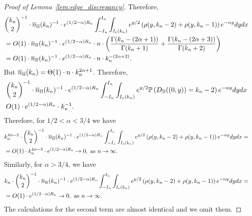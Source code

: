 \begin{proof}[Proof of Lemma~\ref{lem:edge_discrepancy}]
Therefore, 
\begin{equation*} 
\begin{split}
&{k_n \choose 2}^{-1} \cdot \overline{n}_{\mathbb{H}}(k_n)^{-1} \cdot 
e^{(1/2 - \alpha)R_n}
\int_{-I_n}^{I_n} \int_{I_\varepsilon (k_n)} e^{y/2}
\left( \rho(y,k_n-2) + \rho(y,k_n-1) \right) e^{-\alpha y} dy dx \\ 
&=O(1) \cdot \overline{n}_{\mathbb{H}}(k_n)^{-1} \cdot 
e^{(1/2 - \alpha)R_n} \cdot n \cdot \left( 
 \frac{ \Gamma (k_n-(2\alpha+1))}{\Gamma (k_n+1)} + \frac{\Gamma (k_n-(2\alpha+3))}{\Gamma (k_n+2)}\right) \\
& =O(1) \cdot \overline{n}_{\mathbb{H}}(k_n)^{-1} \cdot 
e^{(1/2 - \alpha)R_n} \cdot n \cdot k_n^{-(2\alpha +2)}.
\end{split}
\end{equation*}
But $\overline{n}_{\mathbb{H}}(k_n) = \Theta (1) \cdot n \cdot k_n^{2\alpha +1}$. 
Therefore, 
\begin{equation*} 
\begin{split}
&{k_n \choose 2}^{-1} \cdot \overline{n}_{\mathbb{H}}(k_n)^{-1} \cdot 
e^{(1/2 - \alpha)R_n}
\int_{-I_n}^{I_n} \int_{I_\varepsilon (k_n)} e^{y/2}
\mathbb{P}\left(D_{\mathbb{H}} ((0,y)) = k_n-2\right) e^{-\alpha y} dy dx \\ 
& O(1) \cdot e^{(1/2 - \alpha)R_n} \cdot k_n^{-1}. 
\end{split}
\end{equation*}
Therefore, for $1/2 < \alpha < 3/4$ we have 
\begin{equation*}
\begin{split}
&k_n^{4\alpha -2} \cdot {k_n \choose 2}^{-1} \cdot \expH^{-1} \cdot 
e^{(1/2 - \alpha)R_n}
\int_{-I_n}^{I_n} \int_{I_\eps (k_n)} e^{y/2}
\left( \rho(y,k_n-2) + \rho(y,k_n-1) \right) e^{-\alpha y} dy dx = \\
&=O(1) \cdot k_n^{4\alpha -3} \cdot e^{(1/2 - \alpha)R_n} \to 0, \ \mbox{as } n\to \infty.
\end{split}
\end{equation*}
Similarly, for $\alpha > 3/4$, we have 
\begin{equation*}
\begin{split}
&k_n \cdot {k_n \choose 2}^{-1} \cdot \overline{n}_{\mathbb{H}}(k_n)^{-1} \cdot 
e^{(1/2 - \alpha)R_n}
\int_{-I_n}^{I_n} \int_{I_\varepsilon (k_n)} e^{y/2}
\left( \rho(y,k_n-2) + \rho(y,k_n-1) \right) e^{-\alpha y} dy dx = \\
&=O(1) \cdot e^{(1/2 - \alpha)R_n} \to 0, \ \mbox{as } n\to \infty.
\end{split}
\end{equation*}
The calculations for the second term are almost identical and we omit them.




\end{proof}
